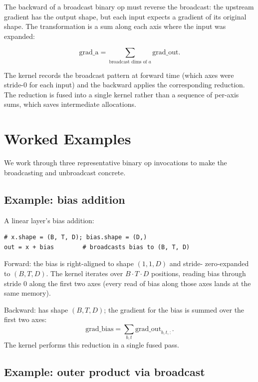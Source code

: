 The backward of a broadcast binary op must reverse the broadcast:
the upstream gradient has the output shape, but each input expects
a gradient of its original shape. The transformation is a sum
along each axis where the input was expanded:

\[
\text{grad\_a} = \sum_{\text{broadcast dims of } a} \text{grad\_out}.
\]

The kernel records the broadcast pattern at forward time (which
axes were stride-0 for each input) and the backward applies the
corresponding reduction. The reduction is fused into a single
kernel rather than a sequence of per-axis sums, which saves
intermediate allocations.

\section{Worked Examples}
\label{sec:binary_functions:examples}

We work through three representative binary op invocations to make
the broadcasting and unbroadcast concrete.

\subsection{Example: bias addition}
\label{ssec:binary_functions:bias_example}

A linear layer's bias addition:

\begin{lstlisting}[style=lucid,language=LucidPython]
# x.shape = (B, T, D); bias.shape = (D,)
out = x + bias        # broadcasts bias to (B, T, D)
\end{lstlisting}

Forward: the bias is right-aligned to shape $(1, 1, D)$ and stride-
zero-expanded to $(B, T, D)$. The kernel iterates over $B \cdot T
\cdot D$ positions, reading bias through stride 0 along the first
two axes (every read of bias along those axes lands at the same
memory).

Backward:  has shape $(B, T, D)$; the gradient for
the bias is summed over the first two axes:
\[
\text{grad\_bias} = \sum_{b, t} \text{grad\_out}_{b, t, :}.
\]
The kernel performs this reduction in a single fused pass.

\subsection{Example: outer product via broadcast}
\label{ssec:binary_functions:outer_example}

